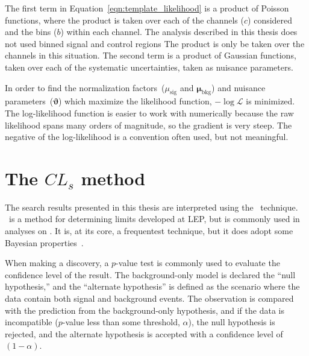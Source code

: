 The first term in Equation~\ref{eqn:template_likelihood} is a product of
Poisson functions, where the product is taken over each of the channels
($c$) considered and the bins ($b$) within each channel.
The analysis described in this thesis does not used binned signal and control
regions
The product is only be taken over the channels in this situation.
The second term is a product of Gaussian functions, taken over each of the
systematic uncertainties, taken as nuisance parameters.

In order to find the normalization factors~($\mu_\mathrm{sig}$ and
$\boldsymbol{\mu_\mathrm{bkg}}$) and nuisance
parameters~($\boldsymbol{\vartheta}$) which maximize the likelihood function, 
$-\log \mathcal{L}$ is minimized.
The log-likelihood function is easier to work with numerically because the
raw likelihood spans many orders of magnitude, so the gradient is very steep.
The negative of the log-likelihood is a convention often used, but not
meaningful.

\section{The $CL_{s}$ method}
\label{apx:cls}

The search results presented in this thesis are interpreted using the \cls\
technique.
\cls\ is a method for determining limits developed at LEP, but is commonly used
in analyses on \atlas.
It is, at its core, a frequentest technique, but it does adopt some Bayesian
properties~\cite{0954-3899-28-10-313,2011EPJC...71.1554C}.

When making a discovery, a $p$-value test is commonly used to evaluate the
confidence level of the result.
The background-only model is declared the ``null hypothesis,'' and the 
``alternate hypothesis'' is defined as the scenario where the data contain both
signal and background events.
The observation is compared with the prediction from the background-only
hypothesis, and if the data is incompatible ($p$-value less than some
threshold, $\alpha$), the null hypothesis is rejected, and the alternate
hypothesis is accepted with a confidence level of $(1-\alpha)$.


